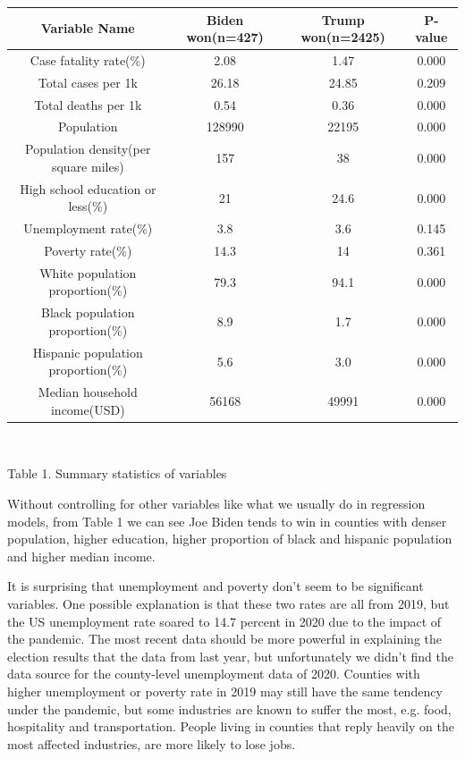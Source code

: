 \documentclass[12pt]{article}
\begin{document}
 \begin{tabular}{cccc}
 	
 	\hline
 	Variable Name&  Biden won(n=427)& Trump won(n=2425)& P-value\\
 	\hline
 	Case fatality rate($\%$)& 2.08& 1.47& 0.000 \\
 	Total cases per 1k& 26.18& 24.85& 0.209 \\
 	Total deaths per 1k& 0.54& 0.36& 0.000\\
 	Population& 128990& 22195 &0.000\\
 	Population density(per square miles)& 157& 38& 0.000\\
 	High school education or less($\%$)& 21& 24.6& 0.000\\
 	Unemployment rate($\%$)& 3.8& 3.6& 0.145\\
 	Poverty rate($\%$)& 14.3& 14& 0.361\\
 	White population proportion($\%$)& 79.3& 94.1& 0.000\\
 	Black population proportion($\%$)& 8.9& 1.7& 0.000\\
 	Hispanic population proportion($\%$)& 5.6& 3.0& 0.000\\
 	Median household income(USD)& 56168& 49991& 0.000\\
    \hline
 	
 \end{tabular} \\
 
\centerline{ Table 1. Summary statistics of variables}

Without controlling for other variables like what we usually do in regression models, from Table 1 we can see Joe Biden tends to win in counties with denser population, higher education, higher proportion of black and hispanic population and higher median income. 

It is surprising that unemployment and poverty don't seem to be significant variables. One possible explanation is that these two rates are all from 2019, but the US unemployment rate soared to 14.7 percent in 2020 due to the impact of the pandemic. The most recent data should be more powerful in explaining the election results that the data from last year, but unfortunately we didn't find the data source for the  county-level unemployment data of 2020. Counties with higher unemployment or poverty rate in 2019 may still have the same tendency under the pandemic, but some industries are known to suffer the most, e.g. food, hospitality and transportation. People living in counties that reply heavily on the most affected industries, are more likely to lose jobs. 
\end{document}
